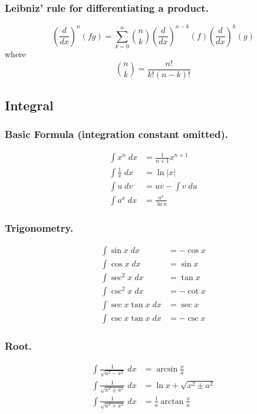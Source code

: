\documentclass[../../../main.tex]{subfiles}
\begin{document}
\subsubsection{Leibniz’ rule for differentiating a product.}
\begin{equation*}
    \left(\frac{d}{dx}\right)^n(fg)=\sum_{k=0}^{n}{n\choose k}\left(\frac{d}{dx}\right)^{n-k}(f)\left(\frac{d}{dx}\right)^k(g)
\end{equation*}
where
\begin{equation*}
    {n \choose k}={\frac{n!}{k! (n-k)!}}
\end{equation*}

\subsection{Integral}
\subsubsection{Basic Formula (integration constant omitted).}
\begin{align*}
    \int x^n \;dx &= \frac{1}{n+1}x^{n+1}\\
    \int \frac{1}{x}\;dx& = \ln |x|\\
    \int u \;dv& = uv - \int v\; du\\
    \int a^x \;dx&=\frac{a^x}{\ln a}
\end{align*}

\subsubsection{Trigonometry.}
\begin{align*}
    \int \sin x \; dx&=-\cos x\\
    \int \cos x \; dx&=\sin x\\
    \int \sec^2 x \; dx&=\tan x\\
    \int \csc^2 x \; dx&=-\cot x\\
    \int \sec x\tan x \; dx&=\sec x\\
    \int \csc x\tan x \; dx&=-\csc x
\end{align*}

\subsubsection{Root.}
\begin{align*}
    \int \frac{1}{\sqrt{a^2-x^2}}\;dx&=\arcsin \frac{x}{a}\\
    \int \frac{1}{\sqrt{x^2\pm a^2}}\;dx&=\ln x +\sqrt{x^2\pm a^2}\\
    \int \frac{1}{\sqrt{a^2+x^2}}\;dx&=\frac{1}{a}\arctan \frac{x}{a}
\end{align*}
\end{document}
